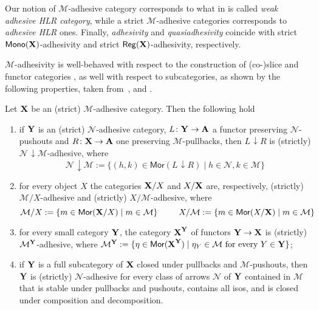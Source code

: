 \documentclass[3p]{elsarticle}
\def\X{\textbf {\textup{X}}}
\def\Y{\textbf {\textup{Y}}}
\def\A{\textbf {\textup{A}}}
\renewcommand{\comma}[2]{#1\hspace{1pt} {\downarrow}#2}
\newcommand{\mor}{\mathsf{Mor}}
\newcommand{\mon}{\mathsf{Mono}}
\newcommand{\reg}{\mathsf{Reg}}
\theoremstyle{remark}
\theoremstyle{definition}
\begin{document}
\begin{rem}
	\label{rem:salva} Our notion of $\mathcal{M}$-adhesive category corresponds to what in \cite{ehrig2006fundamentals} is called \emph{weak adhesive HLR category}, while a strict $\mathcal{M}$-adhesive categories corresponds to \emph{adhesive HLR} ones. Finally, 	\emph{adhesivity} and \emph{quasiadhesivity} 
	\cite{lack2005adhesive,garner2012axioms} coincide with strict
	$\mon(\X) $-adhesivity and strict $\reg(\X)$-adhesivity,
	respectively. %
\end{rem}


$\mathcal{M}$-adhesivity is well-behaved with respect to  the construction of (co-)slice and functor categories \cite{mac2013categories}, as well with respect to subcategories, as shown by the following properties, taken from~\cite[Thm.~4.15]{ehrig2006fundamentals}, \cite[Prop.~3.5]{lack2005adhesive} and  \cite[Thm.~2.12]{CastelnovoGM24}.

\begin{prop}
	\label{thm:slice-functors}
	Let $\X$ be an (strict) $\mathcal{M}$-adhesive category. Then the following hold
	\begin{enumerate}
		\item if $\Y$ is an (strict) $\mathcal{N}$-adhesive category, $L\colon \Y\to \A$ a functor preserving $\mathcal{N}$-pushouts and $R\colon \X\to \A$ one preserving $\mathcal{M}$-pullbacks, then $\comma{L}{R}$ is (strictly) $\comma{\mathcal{N}}{\mathcal{M}}$-adhesive, where
		\[\comma{\mathcal{N}}{\mathcal{M}}:=\{(h,k) \in \mor(\comma{L}{R}) \mid h\in \mathcal{N}, k\in \mathcal{M}\}\]
		\item for every object $X$
		the categories $\X/X$  and $X/\X$ are, respectively, (strictly) $\mathcal{M}/X$-adhesive and (strictly) $X/\mathcal{M}$-adhesive, where
		\[\mathcal{M}/X:=\{m\in \mor(\X/X) \mid m\in
		\mathcal{M}\} \hspace{25pt} X/\mathcal{M}:=\{m\in \mor(X/\X) \mid m\in \mathcal{M}\}\]
		\item for every small category $\Y$, the category $\X^\Y$ of
		functors $\Y\to \X$ is (strictly) $\mathcal{M}^{\Y}$-adhesive, where
		$\mathcal{M}^{\Y}:=\{\eta \in \mor(\X^\Y) \mid \eta_Y \in
		\mathcal{M} \text{ for every } Y\in \Y\}$;
		\item if $\Y$ is a full subcategory of $\X$ closed under pullbacks and $\mathcal{M}$-pushouts, then $\Y$ is (strictly) $\mathcal{N}$-adhesive for every class of arrows $\mathcal{N}$ of $\Y$ contained in $\mathcal{M}$ that is stable under pullbacks and pushouts, contains all isos, and is closed under composition and decomposition.
	\end{enumerate} 
\end{prop}
\end{document}
